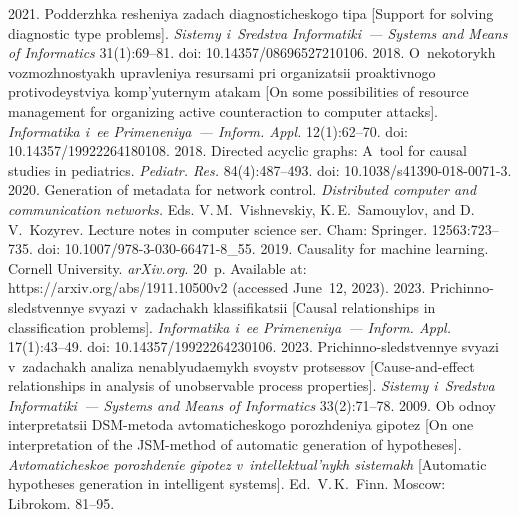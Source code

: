 \begin{multicols}{2}
{{\begin{thebibliography}{99}
 2021.  Podderzhka 
resheniya zadach diagnosticheskogo tipa [Support for solving diagnostic type problems]. 
\textit{Sistemy i~Sredstva Informatiki~--- Systems and Means of Informatics} 31(1):69--81. doi: 
10.14357/08696527210106.
 2018. 
O~nekotorykh vozmozhnostyakh upravleniya resursami pri organizatsii proaktivnogo protivodeystviya 
komp'yuternym atakam [On some possibilities of resource management for organizing active 
counteraction to computer attacks]. \textit{Informatika i~ee Primeneniya~--- Inform. Appl.}  
12(1):62--70. doi: 10.14357/19922264180108.
 2018. 
Directed acyclic graphs: A~tool for causal studies in pediatrics. \textit{Pediatr. Res.} 84(4):487--493. 
doi: 10.1038/s41390-018-0071-3.
 2020. Generation of metadata for 
network control. \textit{Distributed computer and communication networks.} Eds. V.\,M.~Vishnevskiy, 
K.\,E.~Samouylov, and D.\,V.~Kozyrev. Lecture notes in computer science ser.  Cham: Springer. 
12563:723--735. doi: 10.1007/978-3-030-66471-8\_55.
 2019. Causality for machine learning. Cornell University. \textit{arXiv.org}. 20~p. 
Available at: {\sf https://\linebreak arxiv.org/abs/1911.10500v2} (accessed June~12, 2023).
 2023. Prichinno-sledstvennye svyazi v~zadachakh klassifikatsii [Causal 
relationships in classification problems]. \textit{Informatika i~ee Primeneniya~--- Inform. Appl.}  
17(1):43--49. doi: 10.14357/19922264230106.
 2023. Prichinno-sledstvennye svyazi v~zadachakh analiza ne\-nablyu\-da\-emykh 
svoystv protsessov [Cause-and-effect relationships in analysis of unobservable process properties]. 
\textit{Sistemy i~Sredstva Informatiki~--- Systems and Means of Informatics} 33(2):71--78.
 2009. Ob odnoy interpretatsii DSM-metoda avtomaticheskogo porozhdeniya 
gipotez [On one interpretation of the JSM-method of automatic generation of hypotheses]. 
\textit{Avtomaticheskoe porozhdenie gipotez v~intellektual'nykh sistemakh} [Automatic hypotheses 
generation in intelligent systems]. Ed.\ V.\,K.~Finn. Moscow: Librokom. 81--95.
\end{thebibliography}

 }
 }

\end{multicols}

